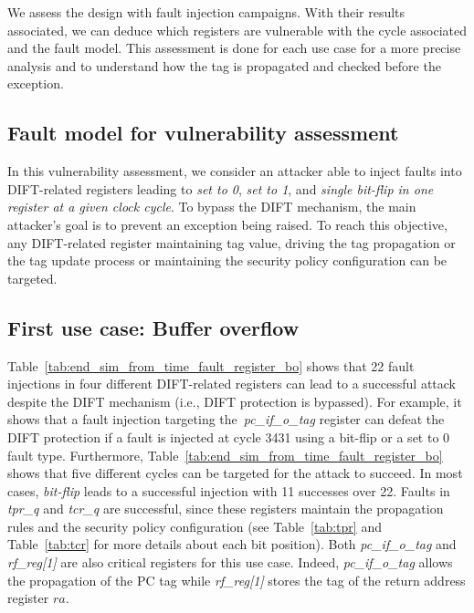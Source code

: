 We assess the design with fault injection campaigns. With their results associated, we can deduce which registers are vulnerable with the cycle associated and the fault model. This assessment is done for each use case for a more precise analysis and to understand how the tag is propagated and checked before the exception.

\subsection{Fault model for vulnerability assessment}
In this vulnerability assessment, we consider an attacker able to inject faults into DIFT-related registers leading to \textit{set to 0}, \textit{set to 1}, and \textit{single bit-flip in one register at a given clock cycle}. To bypass the DIFT mechanism, the main attacker's goal is to prevent an exception being raised. To reach this objective, any DIFT-related register maintaining tag value, driving the tag propagation or the tag update process or maintaining the security policy configuration can be targeted.


\subsection{First use case: Buffer overflow}
Table~\ref{tab:end_sim_from_time_fault_register_bo} shows that 22 fault injections in four different DIFT-related registers can lead to a successful attack despite the DIFT mechanism (i.e., DIFT protection is bypassed). 
For example, it shows that a fault injection targeting the~\textit{pc\_if\_o\_tag} register can defeat the DIFT protection if a fault is injected at cycle 3431 using a bit-flip or a set to 0 fault type.
Furthermore, Table~\ref{tab:end_sim_from_time_fault_register_bo} shows that five different cycles can be targeted for the attack to succeed. In most cases, \textit{bit-flip} leads to a successful injection with 11 successes over 22. Faults in \textit{tpr\_q} and \textit{tcr\_q} are successful, since these registers maintain the propagation rules and the security policy configuration (see Table~\ref{tab:tpr} and Table~\ref{tab:tcr} for more details about each bit position). Both \textit{pc\_if\_o\_tag} and \textit{rf\_reg[1]} are also critical registers for this use case. Indeed, \textit{pc\_if\_o\_tag} allows the propagation of the PC tag while \textit{rf\_reg[1]} stores the tag of the return address register $ra$.

